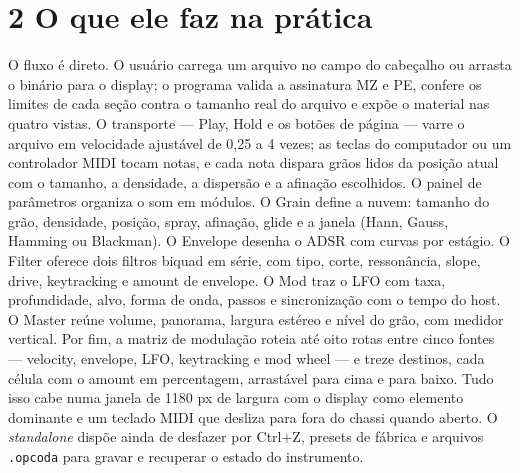 \documentclass[11pt,a4paper]{article}
\newcommand{\code}[1]{\texttt{\small #1}}
\begin{document}
\section*{2 O que ele faz na prática}
O fluxo é direto. O usuário carrega um arquivo no campo do cabeçalho ou arrasta o binário para o display; o programa valida a assinatura MZ e PE, confere os limites de cada seção contra o tamanho real do arquivo e expõe o material nas quatro vistas. O transporte --- Play, Hold e os botões de página --- varre o arquivo em velocidade ajustável de 0,25 a 4 vezes; as teclas do computador ou um controlador MIDI tocam notas, e cada nota dispara grãos lidos da posição atual com o tamanho, a densidade, a dispersão e a afinação escolhidos. O painel de parâmetros organiza o som em módulos. O Grain define a nuvem: tamanho do grão, densidade, posição, spray, afinação, glide e a janela (Hann, Gauss, Hamming ou Blackman). O Envelope desenha o ADSR com curvas por estágio. O Filter oferece dois filtros biquad em série, com tipo, corte, ressonância, slope, drive, keytracking e amount de envelope. O Mod traz o LFO com taxa, profundidade, alvo, forma de onda, passos e sincronização com o tempo do host. O Master reúne volume, panorama, largura estéreo e nível do grão, com medidor vertical. Por fim, a matriz de modulação roteia até oito rotas entre cinco fontes --- velocity, envelope, LFO, keytracking e mod wheel --- e treze destinos, cada célula com o amount em percentagem, arrastável para cima e para baixo. Tudo isso cabe numa janela de 1180 px de largura com o display como elemento dominante e um teclado MIDI que desliza para fora do chassi quando aberto. O \emph{standalone} dispõe ainda de desfazer por Ctrl+Z, presets de fábrica e arquivos \code{.opcoda} para gravar e recuperar o estado do instrumento.
\end{document}
